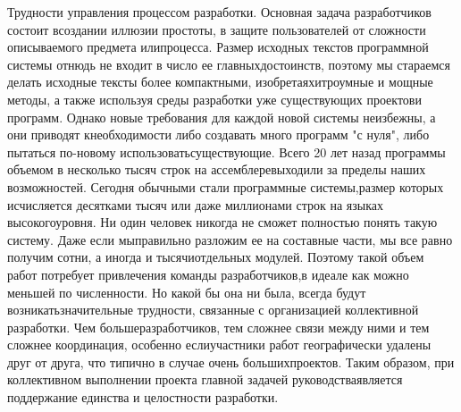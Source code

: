 \documentclass[10pt]{article}
\begin{document}
Трудности управления процессом разработки. Основная задача разработчиков состоит в\linebreak  создании иллюзии простоты, в защите пользователей от сложности описываемого предмета или\linebreak  процесса. Размер исходных текстов программной системы отнюдь не входит в число ее главных\linebreak  достоинств, поэтому мы стараемся делать исходные тексты более компактными, изобретая\linebreak  хитроумные и мощные методы, а также используя среды разработки уже существующих проектов\linebreak  и программ. Однако новые требования для каждой новой системы неизбежны, а они приводят к\linebreak  необходимости либо создавать много программ "с нуля", либо пытаться по-новому использовать\linebreak  существующие. Всего 20 лет назад программы объемом в несколько тысяч строк на ассемблере\linebreak  выходили за пределы наших возможностей. Сегодня обычными стали программные системы,\linebreak  размер которых исчисляется десятками тысяч или даже миллионами строк на языках высокого\linebreak  уровня. Ни один человек никогда не сможет полностью понять такую систему. Даже если мы\linebreak  правильно разложим ее на составные части, мы все равно получим сотни, а иногда и тысячи\linebreak  отдельных модулей. Поэтому такой объем работ потребует привлечения команды разработчиков,\linebreak  в идеале как можно меньшей по численности. Но какой бы она ни была, всегда будут возникать\linebreak  значительные трудности, связанные с организацией коллективной разработки. Чем больше\linebreak  разработчиков, тем сложнее связи между ними и тем сложнее координация, особенно если\linebreak  участники работ географически удалены друг от друга, что типично в случае очень больших\linebreak  проектов. Таким образом, при коллективном выполнении проекта главной задачей руководства\linebreak  является поддержание единства и целостности разработки. \linebreak
\end{document}
